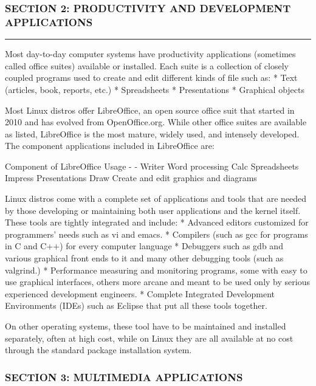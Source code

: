\subsubsection{SECTION 2: PRODUCTIVITY AND DEVELOPMENT
APPLICATIONS}\label{section-2-productivity-and-development-applications}

\begin{center}\rule{3in}{0.4pt}\end{center}

Most day-to-day computer systems have productivity applications
(sometimes called office suites) available or installed. Each suite is a
collection of closely coupled programs used to create and edit different
kinds of file such as: * Text (articles, book, reports, etc.) *
Spreadsheets * Presentations * Graphical objects

Most Linux distros offer LibreOffice, an open source office suit that
started in 2010 and has evolved from OpenOffice.org. While other office
suites are available as listed, LibreOffice is the most mature, widely
used, and intensely developed. The component applications included in
LibreOffice are:

Component of LibreOffice \textbar{} Usage - \textbar{} - Writer
\textbar{} Word processing Calc \textbar{} Spreadsheets Impress
\textbar{} Presentations Draw \textbar{} Create and edit graphics and
diagrams

Linux distros come with a complete set of applications and tools that
are needed by those developing or maintaining both user applications and
the kernel itself. These tools are tightly integrated and include: *
Advanced editors customized for programmers' needs such as vi and emacs.
* Compilers (such as gcc for programs in C and C++) for every computer
language * Debuggers such as gdb and various graphical front ends to it
and many other debugging tools (such as valgrind.) * Performance
measuring and monitoring programs, some with easy to use graphical
interfaces, others more arcane and meant to be used only by serious
experienced development engineers. * Complete Integrated Development
Environments (IDEs) such as Eclipse that put all these tools together.

On other operating systems, these tool have to be maintained and
installed separately, often at high cost, while on Linux they are all
available at no cost through the standard package installation system.

\subsubsection{SECTION 3: MULTIMEDIA
APPLICATIONS}\label{section-3-multimedia-applications}

